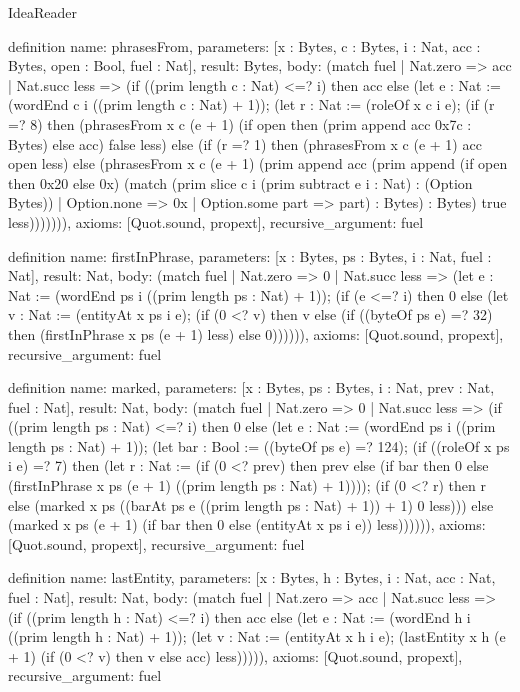 \begin{lexlean}{IdeaReader}
\begin{semanticmodule}
definition{
  name: phrasesFrom,
  parameters: [x : Bytes, c : Bytes, i : Nat, acc : Bytes, open : Bool, fuel : Nat],
  result: Bytes,
  body: (match fuel
    | Nat.zero => acc
    | Nat.succ less => (if ((prim length c : Nat) <=? i) then acc else (let e : Nat := (wordEnd c i ((prim length c : Nat) + 1)); (let r : Nat := (roleOf x c i e); (if (r =? 8) then (phrasesFrom x c (e + 1) (if open then (prim append acc 0x7c : Bytes) else acc) false less) else (if (r =? 1) then (phrasesFrom x c (e + 1) acc open less) else (phrasesFrom x c (e + 1) (prim append acc (prim append (if open then 0x20 else 0x) (match (prim slice c i (prim subtract e i : Nat) : (Option Bytes))
      | Option.none => 0x
      | Option.some part => part) : Bytes) : Bytes) true less))))))),
  axioms: [Quot.sound, propext],
  recursive_argument: fuel
}

definition{
  name: firstInPhrase,
  parameters: [x : Bytes, ps : Bytes, i : Nat, fuel : Nat],
  result: Nat,
  body: (match fuel
    | Nat.zero => 0
    | Nat.succ less => (let e : Nat := (wordEnd ps i ((prim length ps : Nat) + 1)); (if (e <=? i) then 0 else (let v : Nat := (entityAt x ps i e); (if (0 <? v) then v else (if ((byteOf ps e) =? 32) then (firstInPhrase x ps (e + 1) less) else 0)))))),
  axioms: [Quot.sound, propext],
  recursive_argument: fuel
}

definition{
  name: marked,
  parameters: [x : Bytes, ps : Bytes, i : Nat, prev : Nat, fuel : Nat],
  result: Nat,
  body: (match fuel
    | Nat.zero => 0
    | Nat.succ less => (if ((prim length ps : Nat) <=? i) then 0 else (let e : Nat := (wordEnd ps i ((prim length ps : Nat) + 1)); (let bar : Bool := ((byteOf ps e) =? 124); (if ((roleOf x ps i e) =? 7) then (let r : Nat := (if (0 <? prev) then prev else (if bar then 0 else (firstInPhrase x ps (e + 1) ((prim length ps : Nat) + 1)))); (if (0 <? r) then r else (marked x ps ((barAt ps e ((prim length ps : Nat) + 1)) + 1) 0 less))) else (marked x ps (e + 1) (if bar then 0 else (entityAt x ps i e)) less)))))),
  axioms: [Quot.sound, propext],
  recursive_argument: fuel
}

definition{
  name: lastEntity,
  parameters: [x : Bytes, h : Bytes, i : Nat, acc : Nat, fuel : Nat],
  result: Nat,
  body: (match fuel
    | Nat.zero => acc
    | Nat.succ less => (if ((prim length h : Nat) <=? i) then acc else (let e : Nat := (wordEnd h i ((prim length h : Nat) + 1)); (let v : Nat := (entityAt x h i e); (lastEntity x h (e + 1) (if (0 <? v) then v else acc) less))))),
  axioms: [Quot.sound, propext],
  recursive_argument: fuel
}


\end{semanticmodule}
\end{lexlean}
